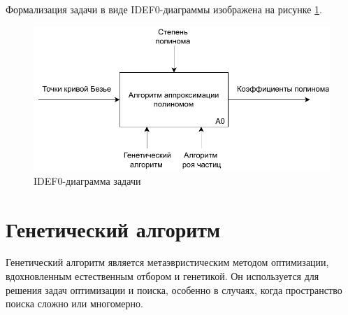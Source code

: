 \documentclass[12pt]{report}
\begin{document}
Формализация задачи в виде IDEF0-диаграммы изображена на рисунке \ref{fig:idef0}.

\begin{figure}[h!]
  \centering
  \includegraphics[scale = 0.83]{idef0.pdf}
  \caption{IDEF0-диаграмма задачи}
  \label{fig:idef0}
\end{figure}


\section{Генетический алгоритм}

Генетический алгоритм  является метаэвристическим методом оптимизации, вдохновленным естественным отбором и генетикой. 
Он используется для решения задач оптимизации и поиска, особенно в случаях, когда пространство поиска сложно или многомерно.
\end{document}
